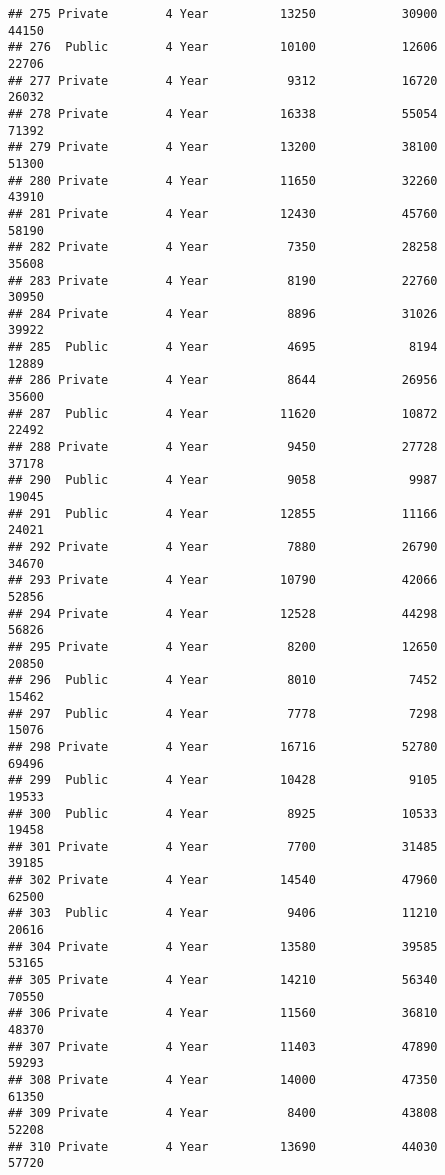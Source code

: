 \documentclass[
]{article}
\begin{document}
\begin{verbatim}
## 275 Private        4 Year          13250            30900          44150
## 276  Public        4 Year          10100            12606          22706
## 277 Private        4 Year           9312            16720          26032
## 278 Private        4 Year          16338            55054          71392
## 279 Private        4 Year          13200            38100          51300
## 280 Private        4 Year          11650            32260          43910
## 281 Private        4 Year          12430            45760          58190
## 282 Private        4 Year           7350            28258          35608
## 283 Private        4 Year           8190            22760          30950
## 284 Private        4 Year           8896            31026          39922
## 285  Public        4 Year           4695             8194          12889
## 286 Private        4 Year           8644            26956          35600
## 287  Public        4 Year          11620            10872          22492
## 288 Private        4 Year           9450            27728          37178
## 290  Public        4 Year           9058             9987          19045
## 291  Public        4 Year          12855            11166          24021
## 292 Private        4 Year           7880            26790          34670
## 293 Private        4 Year          10790            42066          52856
## 294 Private        4 Year          12528            44298          56826
## 295 Private        4 Year           8200            12650          20850
## 296  Public        4 Year           8010             7452          15462
## 297  Public        4 Year           7778             7298          15076
## 298 Private        4 Year          16716            52780          69496
## 299  Public        4 Year          10428             9105          19533
## 300  Public        4 Year           8925            10533          19458
## 301 Private        4 Year           7700            31485          39185
## 302 Private        4 Year          14540            47960          62500
## 303  Public        4 Year           9406            11210          20616
## 304 Private        4 Year          13580            39585          53165
## 305 Private        4 Year          14210            56340          70550
## 306 Private        4 Year          11560            36810          48370
## 307 Private        4 Year          11403            47890          59293
## 308 Private        4 Year          14000            47350          61350
## 309 Private        4 Year           8400            43808          52208
## 310 Private        4 Year          13690            44030          57720

\end{verbatim}
\end{document}
